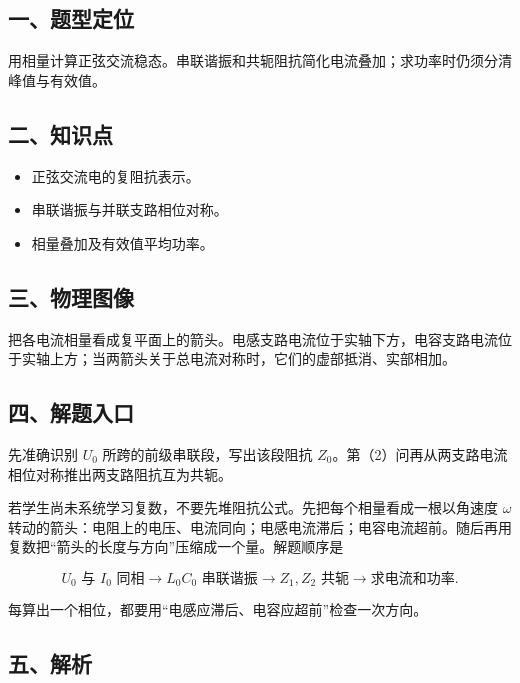 \documentclass[12pt,a4paper,UTF8]{ctexart}
\newcommand{\tightlist}{\setlength{\itemsep}{0pt}\setlength{\parskip}{0pt}}
\begin{document}
\subsection{一、题型定位}\label{ux4e00ux9898ux578bux5b9aux4f4d-4}

用相量计算正弦交流稳态。串联谐振和共轭阻抗简化电流叠加；求功率时仍须分清峰值与有效值。

\subsection{二、知识点}\label{ux4e8cux77e5ux8bc6ux70b9-4}

\begin{itemize}
\tightlist
\item
  正弦交流电的复阻抗表示。
\item
  串联谐振与并联支路相位对称。
\item
  相量叠加及有效值平均功率。
\end{itemize}

\subsection{三、物理图像}\label{ux4e09ux7269ux7406ux56feux50cf-4}

把各电流相量看成复平面上的箭头。电感支路电流位于实轴下方，电容支路电流位于实轴上方；当两箭头关于总电流对称时，它们的虚部抵消、实部相加。

\subsection{四、解题入口}\label{ux56dbux89e3ux9898ux5165ux53e3-4}

先准确识别 \(U_0\) 所跨的前级串联段，写出该段阻抗
\(Z_0\)。第（2）问再从两支路电流相位对称推出两支路阻抗互为共轭。

若学生尚未系统学习复数，不要先堆阻抗公式。先把每个相量看成一根以角速度
\(\omega\)
转动的箭头：电阻上的电压、电流同向；电感电流滞后；电容电流超前。随后再用复数把``箭头的长度与方向''压缩成一个量。解题顺序是

\[U_0\text{ 与 }I_0\text{ 同相}\to L_0C_0\text{ 串联谐振}\to
Z_1,Z_2\text{ 共轭}\to\text{求电流和功率}.\]

每算出一个相位，都要用``电感应滞后、电容应超前''检查一次方向。

\subsection{五、解析}\label{ux4e94ux89e3ux6790-4}
\end{document}
